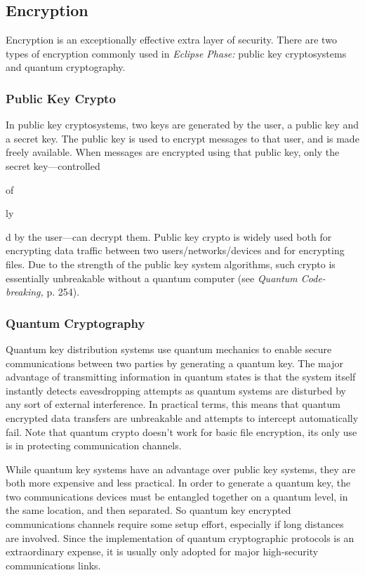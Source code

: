 \subsection{Encryption}

Encryption is an exceptionally effective extra layer of 
security. There are two types of encryption commonly 
used in \textit{Eclipse Phase:} public key cryptosystems and 
quantum cryptography.

\subsubsection{Public Key Crypto}

In public key cryptosystems, two keys are generated 
by the user, a public key and a secret key. The public 
key is used to encrypt messages to that user, and is 
made freely available. When messages are encrypted 
using that public key, only the secret key—controlled 

of 

ly

d
by the user—can decrypt them. Public key crypto is 
widely used both for encrypting data traffic between 
two users/networks/devices and for encrypting 
files. Due to the strength of the public key system 
algorithms, such crypto is essentially unbreakable 
without a quantum computer (see \textit{Quantum Code-}
\textit{breaking,} p. 254).

\subsubsection{Quantum Cryptography}

Quantum key distribution systems use quantum mechanics
to enable secure communications between two
parties by generating a quantum key. The major advantage
of transmitting information in quantum states is
that the system itself instantly detects eavesdropping 
attempts as quantum systems are disturbed by any sort 
of external interference. In practical terms, this means 
that quantum encrypted data transfers are unbreakable 
and attempts to intercept automatically fail. Note that 
quantum crypto doesn't work for basic file encryption, 
its only use is in protecting communication channels.

While quantum key systems have an advantage over 
public key systems, they are both more expensive and 
less practical. In order to generate a quantum key, 
the two communications devices must be entangled 
together on a quantum level, in the same location, 
and then separated. So quantum key encrypted 
communications channels require some setup effort, 
especially if long distances are involved. Since the 
implementation of quantum cryptographic protocols 
is an extraordinary expense, it is usually only adopted 
for major high-security communications links.

